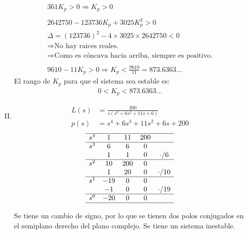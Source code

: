 \begin{ejercicio}
\begin{enumerate}
\begin{enumerate}[I.]
        \begin{align*}
          361K_p > 0 \Rightarrow K_p > 0
          \\ \\
          2642750 - 123736 K_p + 3025K_p^2 > 0
          \\
          \Delta = (123736)^2-4\times3025\times 2642750 < 0
          \\
          \Rightarrow \text{No hay raices reales.}
          \\
          \Rightarrow \text{Como es cóncava hacia arriba, siempre es positivo.}
          \\
          \\
          9610-11K_p > 0 \Rightarrow K_p < \frac{9610}{11} = 873.6363... 
        \end{align*}
        El rango de $K_p$ para que el sistema sea estable es:
        \begin{align*}
          0 < K_p < 873.6363...
        \end{align*}
      \item 
        \begin{align*}
          L(s) &= \frac{200}{s(s^3+6s^2+11s+6)}
          \\
          p(s) &= s^4 + 6s^3 + 11s^2 + 6s + 200
        \end{align*}
        \[
          \begin{matrix}
          \hline
          s^4 & 1 & 11 & 200
          \\\hline
          s^3 & 6 & 6 & 0
          \\
           & 1 & 1 & 0 & \cdot / 6
          \\\hline
          s^2 & 10 & 200 & 0
          \\
          & 1 & 20 & 0 & \cdot / 10
          \\\hline
          s^1 & -19 & 0 & 0
          \\
           & -1 & 0 & 0 & \cdot / 19
          \\\hline
          s^0 & -20 & 0 & 0
          \\\hline
          \end{matrix}
        \]

        Se tiene un cambio de signo, por lo que se tienen dos polos conjugados en el semiplano derecho del plano complejo. Se tiene un sistema inestable.



\end{enumerate}
\end{enumerate}
\end{ejercicio}
